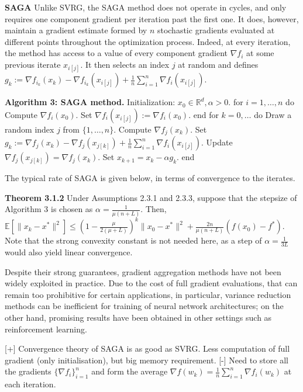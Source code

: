 \documentclass[a4paper,6pt]{extarticle}
\begin{document}
\begin{multicols}{2}
{\textbf{SAGA} Unlike SVRG, the SAGA method does not operate in cycles, and only requires one component gradient per iteration past the first one. It does, however, maintain a gradient estimate formed by \( n \) stochastic gradients evaluated at different points throughout the optimization process. Indeed, at every iteration, the method has access to a value of every component gradient \( \nabla f_{i} \) at some previous iterate \( x_{i[j]} \). It then selects an index \( j \) at random and defines $g_k := \nabla f_{i_k}(x_k) - \nabla f_{i_k}(x_{i[j]}) + \frac{1}{n} \sum_{i=1}^{n} \nabla f_i(x_{i[j]}).$

\textbf{Algorithm 3: SAGA method.}
Initialization: \( x_0 \in \mathbb{R}^d, \alpha > 0 \).
for \( i = 1, \ldots, n \) do
Compute \( \nabla f_i(x_0) \).
Set \( \nabla f_i(x_{i[j]}) := \nabla f_i(x_0) \).
end
for \( k = 0, \ldots \) do
Draw a random index \( j \) from \( \{1, \ldots, n\} \).
Compute \( \nabla f_j(x_k) \).
Set \( g_k := \nabla f_j(x_k) - \nabla f_j(x_{j[k]}) + \frac{1}{n} \sum_{i=1}^{n} \nabla f_i(x_{i[j]}) \).
Update \( \nabla f_j(x_{j[k]}) = \nabla f_j(x_k) \).
Set \( x_{k+1} = x_k - \alpha g_k \).
end

The typical rate of SAGA is given below, in terms of convergence to the iterates.

\textbf{Theorem 3.1.2} Under Assumptions 2.3.1 and 2.3.3, suppose that the stepsize of Algorithm 3 is chosen as \( \alpha = \frac{1}{\mu(n+L)} \). Then,
$\mathbb{E}[\|x_k - x^*\|^2] \leq \left( 1 - \frac{\mu}{2(\mu + L)} \right)^k \|x_0 - x^*\|^2 + \frac{2n}{\mu(n + L)}(f(x_0) - f^*).$
Note that the strong convexity constant is not needed here, as a step of \( \alpha = \frac{1}{3L} \) would also yield linear convergence.

Despite their strong guarantees, gradient aggregation methods have not been widely exploited in practice. Due to the cost of full gradient evaluations, that can remain too prohibitive for certain applications, in particular, variance reduction methods can be inefficient for training of neural network architectures; on the other hand, promising results have been obtained in other settings such as reinforcement learning.

[+] Convergence theory of SAGA is as good as SVRG. Less computation of full gradient (only initialisation), but big memory requirement.
[-] Need to store all the gradients $\{ \nabla f_i \}_{i=1}^n$ and form the average $\nabla f(w_k) = \frac{1}{n} \sum_{i=1}^n \nabla f_i(w_k)$ at each iteration.

}
\end{multicols}
\end{document}
